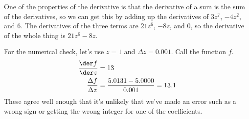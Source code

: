 One of the properties of the derivative is that the derivative of a sum is the sum of the derivatives,
so we can get this by adding up the derivatives of $3z^7$, $-4z^2$, and 6. The derivatives of the
three terms are $21z^6$, $-8z$, and 0, so the derivative of the whole thing is $21z^6-8z$.

For the numerical check, let's use $z=1$ and $\Delta z=0.001$. Call the function $f$.
\begin{align*}
  \frac{\der f}{\der z} &= 13 \\
  \frac{\Delta f}{\Delta z} &= \frac{5.0131-5.0000}{0.001} = 13.1
\end{align*}
These agree well enough that it's unlikely that we've made an error such as a wrong sign or getting
the wrong integer for one of the coefficients.


